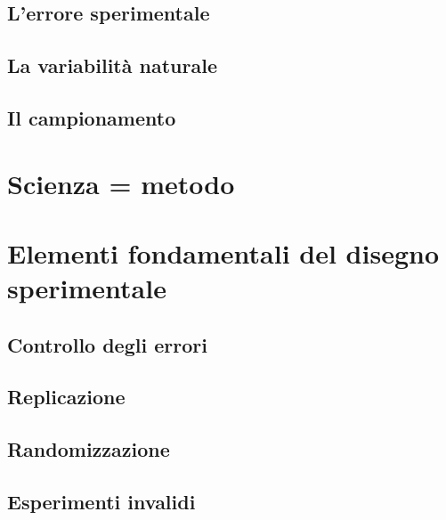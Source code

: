 \documentclass[a4paper,12pt,oneside]{book}
\begin{document}
\hypertarget{lerrore-sperimentale}{%
\subsection{L'errore sperimentale}\label{lerrore-sperimentale}}

\hypertarget{la-variabilita-naturale}{%
\subsection{La variabilità naturale}\label{la-variabilita-naturale}}

\hypertarget{il-campionamento}{%
\subsection{Il campionamento}\label{il-campionamento}}

\hypertarget{scienza-metodo}{%
\section{Scienza = metodo}\label{scienza-metodo}}

\hypertarget{elementi-fondamentali-del-disegno-sperimentale}{%
\section{Elementi fondamentali del disegno sperimentale}\label{elementi-fondamentali-del-disegno-sperimentale}}

\hypertarget{controllo-degli-errori}{%
\subsection{Controllo degli errori}\label{controllo-degli-errori}}

\hypertarget{replicazione}{%
\subsection{Replicazione}\label{replicazione}}

\hypertarget{randomizzazione}{%
\subsection{Randomizzazione}\label{randomizzazione}}

\hypertarget{esperimenti-invalidi}{%
\subsection{Esperimenti invalidi}\label{esperimenti-invalidi}}
\end{document}
